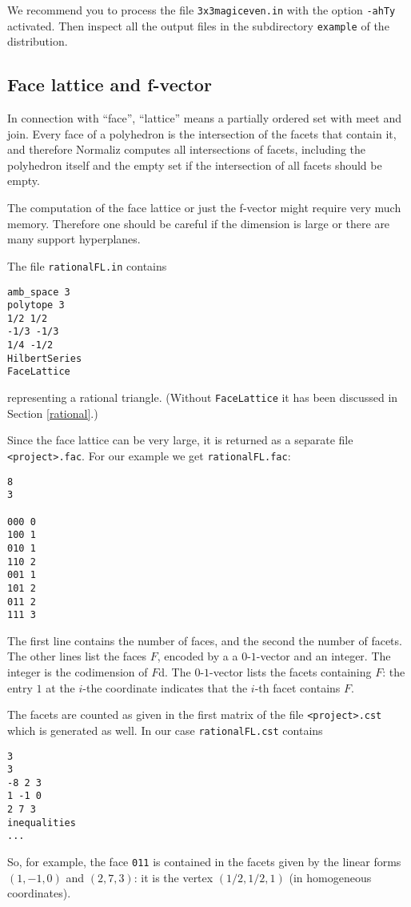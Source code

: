 \documentclass[12pt,a4paper]{scrartcl}
\theoremstyle{definition}
\def\ttt{\texttt}
\begin{document}
{ We recommend you to process the file \ttt{3x3magiceven.in} with the
option \ttt{-ahTy} activated. Then inspect all
the output files in the subdirectory \ttt{example} of the
distribution.

\subsection{Face lattice and f-vector}\label{FaceLattice}

In connection with ``face'', ``lattice'' means a partially ordered set with meet and join. Every face of a polyhedron is the intersection of the facets that contain it, and therefore Normaliz computes all intersections of facets, including the polyhedron itself and the empty set if the intersection of all facets should be empty.

The computation of the face lattice or just the f-vector might require very much memory. Therefore one should be careful if the dimension is large or there are many support hyperplanes.

The file \verb|rationalFL.in| contains
\begin{Verbatim}
amb_space 3
polytope 3
1/2 1/2
-1/3 -1/3
1/4 -1/2
HilbertSeries
FaceLattice
\end{Verbatim}
representing a rational triangle. (Without \verb|FaceLattice| it has been discussed in Section \ref{rational}.)

Since the face lattice can be very large, it is returned as a separate file \verb|<project>.fac|. For our example we get \verb|rationalFL.fac|:
\begin{Verbatim}
8
3

000 0
100 1
010 1
110 2
001 1
101 2
011 2
111 3
\end{Verbatim}
The first line contains the number of faces, and the second the number of facets. The other lines list the faces $F$, encoded by a a $0$-$1$-vector and an integer. The integer is the codimension of $F$d.  The $0$-$1$-vector lists the facets containing $F$: the entry $1$ at the $i$-the coordinate indicates that the $i$-th facet contains $F$.

The facets are counted as given in the first matrix of the file  \verb|<project>.cst| which is generated as well. In our case \verb|rationalFL.cst| contains
\begin{Verbatim}
3
3
-8 2 3 
1 -1 0 
2 7 3 
inequalities
...
\end{Verbatim}
So, for example, the face \verb|011| is contained in the facets  given by the linear forms $(1,-1,0)$ and 
$(2, 7,3)$: it is the vertex $(1/2,1/2,1)$ (in homogeneous coordinates). 

}
\end{document}
